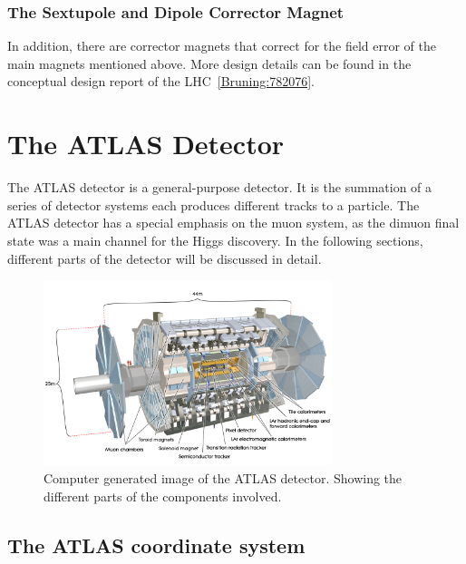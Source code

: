 \subsubsection*{The Sextupole and Dipole Corrector Magnet}
In addition, there are corrector magnets that correct for the field error of the main magnets mentioned above. More design details can be found in the conceptual design report of the LHC~\ref{Bruning:782076}.

\section{The ATLAS Detector}
\label{ATLAS}
The ATLAS detector is a general-purpose detector. It is the summation of a series of detector systems each produces different tracks to a particle. The ATLAS detector has a special emphasis on the muon system, as the dimuon final state was a main channel for the Higgs discovery. In the following sections, different parts of the detector will be discussed in detail. 

\begin{figure}[!htb]
    \begin{center}
        \includegraphics[width=0.75\textwidth]{figures/chapter_ATLAS/ATLASDetector}
        \caption{
			Computer generated image of the ATLAS detector\cite{Pequenao:1095924}. Showing the different parts of the components involved. 
        }
        \label{fig:ATLASDectector}
    \end{center}
\end{figure}


\subsection*{The ATLAS coordinate system}

